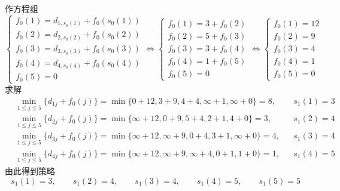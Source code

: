 \documentclass[lang = cn, scheme = chinese, thmcnt = section]{elegantbook}
\begin{document}
\begin{solution}
	作方程组
	$$
	\begin{cases}
		f_0(1)=d_{1,s_0(1)}+f_0(s_0(1))\\
		f_0(2)=d_{2,s_0(2)}+f_0(s_0(2))\\
		f_0(3)=d_{3,s_0(3)}+f_0(s_0(3))\\
		f_0(4)=d_{4,s_0(4)}+f_0(s_0(4))\\
		f_0(5)=0
	\end{cases}
	\iff
	\begin{cases}
		f_0(1)=3+f_0(2)\\
		f_0(2)=5+f_0(3)\\
		f_0(3)=3+f_0(4)\\
		f_0(4)=1+f_0(5)\\
		f_0(5)=0
	\end{cases}
	\iff
	\begin{cases}
		f_0(1)=12\\
		f_0(2)=9\\
		f_0(3)=4\\
		f_0(4)=1\\
		f_0(5)=0
	\end{cases}
	$$
	求解
	\begin{align*}
		& \min_{1\le  j \le 5}\{ d_{1j}+f_0(j) \}
		=\min\{ 0+12, 3+9, 4+4, \infty+1, \infty+0 \}
		=8,&&
		s_1(1)=3\\
		& \min_{1\le  j \le 5}\{ d_{2j}+f_0(j) \}
		=\min\{ \infty+12, 0+9, 5+4, 2+1, 4+0 \}
		=3,&&
		s_1(2)=4\\
		& \min_{1\le  j \le 5}\{ d_{3j}+f_0(j) \}
		=\min\{ \infty+12, \infty+9, 0+4, 3+1, \infty+0 \}
		=4,&&
		s_1(3)=4\\
		& \min_{1\le  j \le 5}\{ d_{4j}+f_0(j) \}
		=\min\{ \infty+12, \infty+9, \infty+4, 0+1, 1+0 \}
		=1,&&
		s_1(4)=5
	\end{align*}
	由此得到策略
	$$
	s_1(1)=3,\qquad
	s_1(2)=4,\qquad
	s_1(3)=4,\qquad
	s_1(4)=5,\qquad
	s_1(5)=5
	$$
	

\end{solution}
\end{document}
